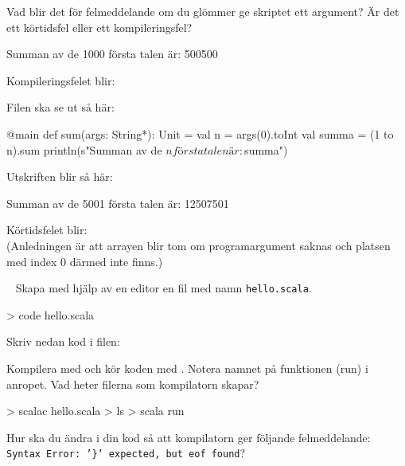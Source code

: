 \Subtask Vad blir det för felmeddelande om du glömmer ge skriptet ett argument? Är det ett körtidsfel eller ett kompileringsfel?

\SOLUTION

\TaskSolved \what

\SubtaskSolved
\begin{REPL}
Summan av de 1000 första talen är: 500500
\end{REPL}

\SubtaskSolved  Kompileringsfelet blir: 

\SubtaskSolved  Filen ska se ut så här:
\begin{Code}
@main
def sum(args: String*): Unit =
  val n = args(0).toInt
  val summa = (1 to n).sum
  println(s"Summan av de $n första talen är: $summa")
\end{Code}

Utskriften blir så här:
\begin{REPL}
Summan av de 5001 första talen är: 12507501
\end{REPL}

\SubtaskSolved Körtidsfelet blir: \\(Anledningen är att arrayen  blir tom om programargument saknas och platsen med index $0$ därmed inte finns.)

\QUESTEND






\QUESTBEGIN

\Task  \what~  Skapa med hjälp av en editor en fil med namn \texttt{hello.scala}.
\begin{REPLnonum}
> code hello.scala
\end{REPLnonum}
Skriv nedan kod i filen:



\Subtask Kompilera med  och kör koden med . Notera namnet på funktionen (run) i anropet. Vad heter filerna som kompilatorn skapar?
\begin{REPLnonum}
> scalac hello.scala
> ls
> scala run
\end{REPLnonum}

\Subtask Hur ska du ändra i din kod så att kompilatorn ger följande felmeddelande: \\
\texttt{Syntax Error: '\}' expected, but eof found}?


